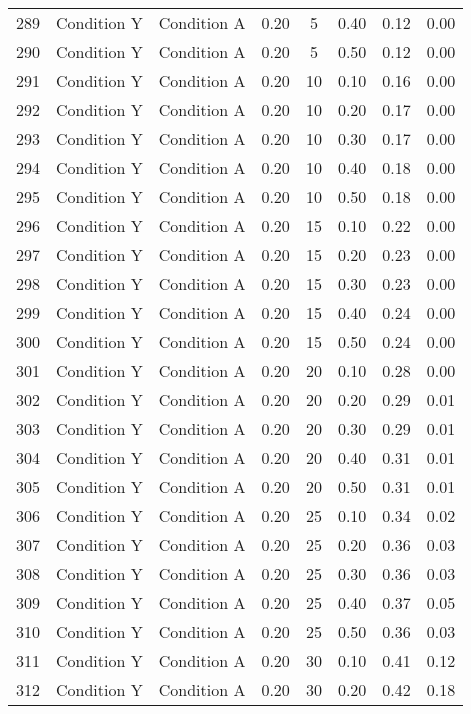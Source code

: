 \begin{landscape}
\begin{longtable}{cc cc cc cc}
  289 & Condition Y & Condition A & 0.20 &   5 & 0.40 & 0.12 & 0.00 \\ 
  290 & Condition Y & Condition A & 0.20 &   5 & 0.50 & 0.12 & 0.00 \\ 
  291 & Condition Y & Condition A & 0.20 &  10 & 0.10 & 0.16 & 0.00 \\ 
  292 & Condition Y & Condition A & 0.20 &  10 & 0.20 & 0.17 & 0.00 \\ 
  293 & Condition Y & Condition A & 0.20 &  10 & 0.30 & 0.17 & 0.00 \\ 
  294 & Condition Y & Condition A & 0.20 &  10 & 0.40 & 0.18 & 0.00 \\ 
  295 & Condition Y & Condition A & 0.20 &  10 & 0.50 & 0.18 & 0.00 \\ 
  296 & Condition Y & Condition A & 0.20 &  15 & 0.10 & 0.22 & 0.00 \\ 
  297 & Condition Y & Condition A & 0.20 &  15 & 0.20 & 0.23 & 0.00 \\ 
  298 & Condition Y & Condition A & 0.20 &  15 & 0.30 & 0.23 & 0.00 \\ 
  299 & Condition Y & Condition A & 0.20 &  15 & 0.40 & 0.24 & 0.00 \\ 
  300 & Condition Y & Condition A & 0.20 &  15 & 0.50 & 0.24 & 0.00 \\ 
  301 & Condition Y & Condition A & 0.20 &  20 & 0.10 & 0.28 & 0.00 \\ 
  302 & Condition Y & Condition A & 0.20 &  20 & 0.20 & 0.29 & 0.01 \\ 
  303 & Condition Y & Condition A & 0.20 &  20 & 0.30 & 0.29 & 0.01 \\ 
  304 & Condition Y & Condition A & 0.20 &  20 & 0.40 & 0.31 & 0.01 \\ 
  305 & Condition Y & Condition A & 0.20 &  20 & 0.50 & 0.31 & 0.01 \\ 
  306 & Condition Y & Condition A & 0.20 &  25 & 0.10 & 0.34 & 0.02 \\ 
  307 & Condition Y & Condition A & 0.20 &  25 & 0.20 & 0.36 & 0.03 \\ 
  308 & Condition Y & Condition A & 0.20 &  25 & 0.30 & 0.36 & 0.03 \\ 
  309 & Condition Y & Condition A & 0.20 &  25 & 0.40 & 0.37 & 0.05 \\ 
  310 & Condition Y & Condition A & 0.20 &  25 & 0.50 & 0.36 & 0.03 \\ 
  311 & Condition Y & Condition A & 0.20 &  30 & 0.10 & 0.41 & 0.12 \\ 
  312 & Condition Y & Condition A & 0.20 &  30 & 0.20 & 0.42 & 0.18 \\ 

\end{longtable}
\end{landscape}
